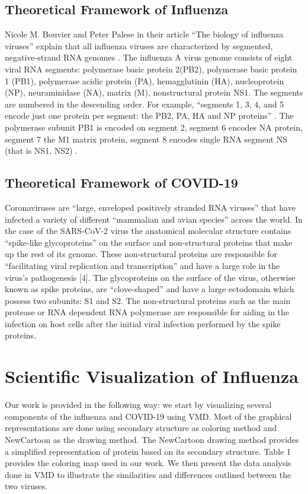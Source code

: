 \documentclass[conference]{IEEEtran}
\begin{document}
\subsection{Theoretical Framework of Influenza}
Nicole M. Bouvier and Peter Palese in their article “The biology of influenza viruses” explain that all influenza viruses are characterized by segmented, negative-strand RNA genomes \citep{Bouvier}. The influenza A virus genome consists of eight viral RNA segments: polymerase basic protein 2(PB2), polymerase basic protein 1 (PB1), polymerase acidic protein (PA), hemagglutinin (HA), nucleoprotein (NP), neuraminidase (NA), matrix (M), nonstructural protein NS1. The segments are numbered in the descending order. For example, “segments 1, 3, 4, and 5 encode just one protein per segment: the PB2, PA, HA and NP proteins” \citep{Bouvier}. The polymerase subunit PB1 is encoded on segment 2, segment 6 encodes NA protein, segment 7 the M1 matrix protein, segment 8 encodes single RNA segment NS (that is NS1, NS2) \citep{Bouvier}. 

\subsection{Theoretical Framework of COVID-19}
Coronaviruses are “large, enveloped positively stranded RNA viruses” that have infected a variety of different “mammalian and avian species” across the world. In the case of the SARS-CoV-2 virus the anatomical molecular structure contains “spike-like glycoproteins” on the surface and non-structural proteins that make up the rest of its genome. These non-structural proteins are responsible for “facilitating viral replication and transcription” and have a large role in the virus’s pathogenesis [4]. The glycoproteins on the surface of the virus, otherwise known as spike proteins, are “clove-shaped” and have a large ectodomain which possess two subunits: S1 and S2. The non-structural proteins such as the main protease or RNA dependent RNA polymerase are responsible for aiding in the infection on host cells after the initial viral infection performed by the spike proteins.  

\section{Scientific Visualization of Influenza}
Our work is provided in the following way: we start by visualizing several components of the influenza and COVID-19 using VMD. Most of the graphical representations are done using secondary structure as coloring method and NewCartoon as the drawing method. The NewCartoon drawing method provides a simplified representation of protein based on its secondary structure. Table 1 provides the coloring map used in our work. We then present the data analysis done in VMD to illustrate the similarities and differences outlined between the two viruses.
\end{document}
